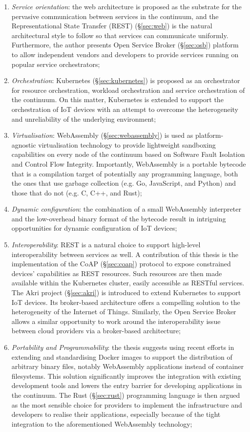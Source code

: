 \begin{enumerate}
    \item \emph{Service orientation}: the web architecture is proposed as the substrate for the pervasive communication between services in the continuum, and the Representational State Transfer (REST) (§\ref{sec:web}) is the natural architectural style to follow so that services can communicate uniformly. Furthermore, the author presents Open Service Broker (§\ref{sec:osb}) platform to allow independent vendors and developers to provide services running on popular service orchestrators;
    \item \emph{Orchestration}: Kubernetes (§\ref{sec:kubernetes}) is proposed as an orchestrator for resource orchestration, workload orchestration and service orchestration of the continuum. On this matter, Kubernetes is extended to support the orchestration of IoT devices with an attempt to overcome the heterogeneity and unreliability of the underlying environment;
    \item \emph{Virtualisation}: WebAssembly (§\ref{sec:webassembly}) is used as platform-agnostic virtualisation technology to provide lightweight sandboxing capabilities on every node of the continuum based on Software Fault Isolation and Control Flow Integrity. Importantly, WebAssembly is a portable bytecode that is a compilation target of potentially any programming language, both the ones that use garbage collection (e.g. Go, JavaScript, and Python) and those that do not (e.g. C, C++, and Rust);
    \item \emph{Dynamic configuration}: the combination of a small WebAssembly interpreter and the low-overhead binary format of the bytecode result in intriguing opportunities for dynamic configuration of IoT devices;
    \item \emph{Interoperability}: REST is a natural choice to support high-level interoperability between services as well. A contribution of this thesis is the implementation of the CoAP (§\ref{sec:coap}) protocol to expose constrained devices' capabilities as REST resources. Such resources are then made available within the Kubernetes cluster, easily accessible as RESTful services. The Akri project (§\ref{sec:akri}) is introduced to extend Kubernetes to support IoT devices. Its broker-based architecture offers a compelling solution to the heterogeneity of the Internet of Things. Similarly, the Open Service Broker allows a similar opportunity to work around the interoperability issue between cloud providers via a broker-based architecture;
    \item \emph{Portability and Programmability}: the thesis suggests using recent efforts in extending and standardising Docker images to support the distribution of arbitrary binary files, notably WebAssembly applications instead of container filesystems. This solution significantly improves the integration with existing development tools and lowers the entry barrier for developing applications in the continuum. The Rust (§\ref{sec:rust}) programming language is then argued as the most sensible choice for providers to implement the infrastructure and developers to realise their applications, especially because of the tight integration to the aforementioned WebAssembly technology;

\end{enumerate}
